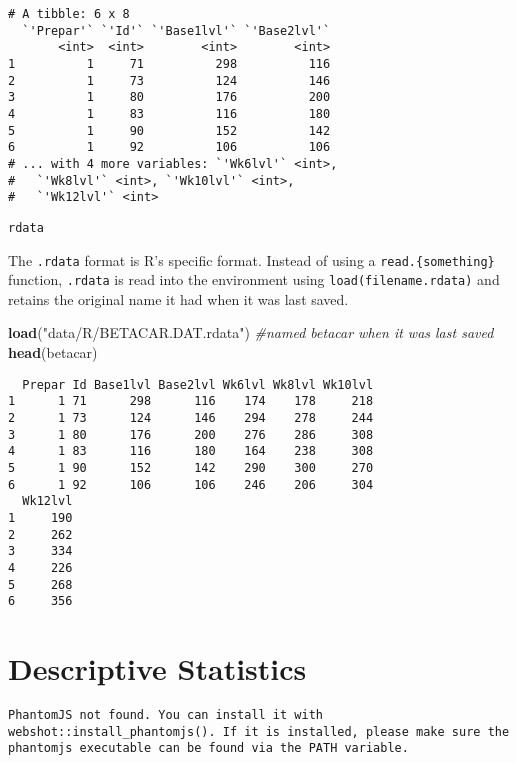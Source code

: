 \documentclass[12pt,]{article}
\newenvironment{Shaded}{\begin{snugshade}}{\end{snugshade}}
\newcommand{\CommentTok}[1]{\textcolor[rgb]{0.56,0.35,0.01}{\textit{#1}}}
\newcommand{\KeywordTok}[1]{\textcolor[rgb]{0.13,0.29,0.53}{\textbf{#1}}}
\newcommand{\NormalTok}[1]{#1}
\newcommand{\StringTok}[1]{\textcolor[rgb]{0.31,0.60,0.02}{#1}}
\begin{document}
\begin{verbatim}
# A tibble: 6 x 8
  `'Prepar'` `'Id'` `'Base1lvl'` `'Base2lvl'`
       <int>  <int>        <int>        <int>
1          1     71          298          116
2          1     73          124          146
3          1     80          176          200
4          1     83          116          180
5          1     90          152          142
6          1     92          106          106
# ... with 4 more variables: `'Wk6lvl'` <int>,
#   `'Wk8lvl'` <int>, `'Wk10lvl'` <int>,
#   `'Wk12lvl'` <int>
\end{verbatim}

\texttt{rdata}

The \texttt{.rdata} format is R's specific format. Instead of using a
\texttt{read.\{something\}} function, \texttt{.rdata} is read into the
environment using \texttt{load(filename.rdata)} and retains the original
name it had when it was last saved.

\begin{Shaded}
\begin{Highlighting}[]
\KeywordTok{load}\NormalTok{(}\StringTok{"data/R/BETACAR.DAT.rdata"}\NormalTok{)  }\CommentTok{#named betacar when it was last saved}
\KeywordTok{head}\NormalTok{(betacar)}
\end{Highlighting}
\end{Shaded}

\begin{verbatim}
  Prepar Id Base1lvl Base2lvl Wk6lvl Wk8lvl Wk10lvl
1      1 71      298      116    174    178     218
2      1 73      124      146    294    278     244
3      1 80      176      200    276    286     308
4      1 83      116      180    164    238     308
5      1 90      152      142    290    300     270
6      1 92      106      106    246    206     304
  Wk12lvl
1     190
2     262
3     334
4     226
5     268
6     356
\end{verbatim}

\hypertarget{descriptive-statistics}{%
\section{Descriptive Statistics}\label{descriptive-statistics}}

\begin{verbatim}
PhantomJS not found. You can install it with webshot::install_phantomjs(). If it is installed, please make sure the phantomjs executable can be found via the PATH variable.
\end{verbatim}
\end{document}
